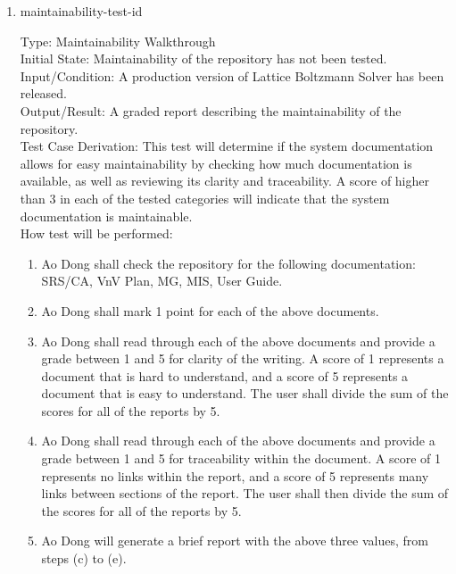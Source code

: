 \documentclass[12pt, titlepage]{article}
\newcommand{\famname}{Lattice Boltzmann Solver}
\newcounter{testcounter} %
\begin{document}
\begin{enumerate}

\item{maintainability-test-id\thetestcounter \\}

Type: Maintainability Walkthrough\\
					
Initial State: Maintainability of the repository has not been tested.\\
					
Input/Condition: A production version of {\famname} has been released.\\
					
Output/Result: A graded report describing the maintainability of the repository.\\

Test Case Derivation: This test will determine if the system documentation
allows for easy maintainability by checking how much documentation is available,
as well as reviewing its clarity and traceability. A score of higher than 3 in
each of the tested categories will indicate that the system documentation is
maintainable.\\
					
How test will be performed: 

\begin{enumerate}
\item Ao Dong shall check the repository for the following documentation:
SRS/CA, VnV Plan, MG, MIS, User Guide.
\item Ao Dong shall mark 1 point for each of the above documents.
\item Ao Dong shall read through each of the above documents and provide a grade
between 1 and 5 for clarity of the writing. A score of 1 represents a document
that is hard to understand, and a score of 5 represents a document that is easy
to understand. The user shall divide the sum of the scores for all of the
reports by 5.
\item Ao Dong shall read through each of the above documents and provide a grade
between 1 and 5 for traceability within the document. A score of 1 represents no
links within the report, and a score of 5 represents many links between sections
of the report. The user shall then divide the sum of the scores for all of the
reports by 5.
\item Ao Dong will generate a brief report with the above three values, from
steps (c) to (e).\\
\end{enumerate}

\end{enumerate}
\end{document}
